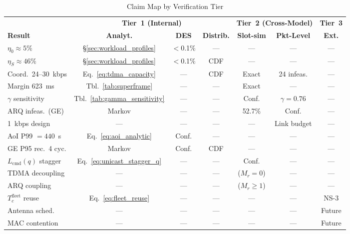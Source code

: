 \documentclass[journal]{IEEEtran}
\begin{document}
\begin{table}[t]
    \centering
    \caption{Claim Map by Verification Tier}
    \label{tab:claim_map}
    \footnotesize
    \begin{tabular}{@{}lcccccc@{}}
        \toprule
         & \multicolumn{3}{c}{\textbf{Tier~1 (Internal)}} & \multicolumn{2}{c}{\textbf{Tier~2 (Cross-Model)}} & \textbf{Tier~3} \\
        \cmidrule(lr){2-4} \cmidrule(lr){5-6} \cmidrule(lr){7-7}
        \textbf{Result} & \textbf{Analyt.} & \textbf{DES} & \textbf{Distrib.} & \textbf{Slot-sim} & \textbf{Pkt-Level} & \textbf{Ext.} \\
        \midrule
        $\eta_0 \approx 5\%$ & \S\ref{sec:workload_profiles} & $<$0.1\% & --- & --- & --- & --- \\
        $\eta_S \approx 46\%$ & \S\ref{sec:workload_profiles} & $<$0.1\% & CDF & --- & --- & --- \\
        Coord.\ 24--30~kbps & Eq.~\ref{eq:tdma_capacity} & --- & CDF & Exact & 24 infeas. & --- \\
        Margin 623~ms & Tbl.~\ref{tab:superframe} & --- & --- & Exact & --- & --- \\
        $\gamma$ sensitivity & Tbl.~\ref{tab:gamma_sensitivity} & --- & --- & Conf. & $\gamma\!=\!0.76$ & --- \\
        ARQ infeas.\ (GE) & Markov & --- & --- & 52.7\% & Conf. & --- \\
        1~kbps design & --- & --- & --- & --- & Link budget & --- \\
        AoI P99 $= 440$~s & Eq.~\ref{eq:aoi_analytic} & Conf. & --- & --- & --- & --- \\
        GE P95 rec.\ 4 cyc. & Markov & Conf. & CDF & --- & --- & --- \\
        $L_{\text{cmd}}(q)$ stagger & Eq.~\ref{eq:unicast_stagger_q} & --- & --- & Conf. & --- & --- \\
        TDMA decoupling & --- & --- & --- & ($M_r\!=\!0$) & --- & --- \\
        ARQ coupling & --- & --- & --- & ($M_r\!\geq\!1$) & --- & --- \\
        $T_c^{\text{fleet}}$ reuse & Eq.~\ref{eq:fleet_reuse} & --- & --- & --- & --- & NS-3 \\
        Antenna sched. & --- & --- & --- & --- & --- & Future \\
        MAC contention & --- & --- & --- & --- & --- & Future \\
        \bottomrule
    \end{tabular}
\end{table}
\end{document}
